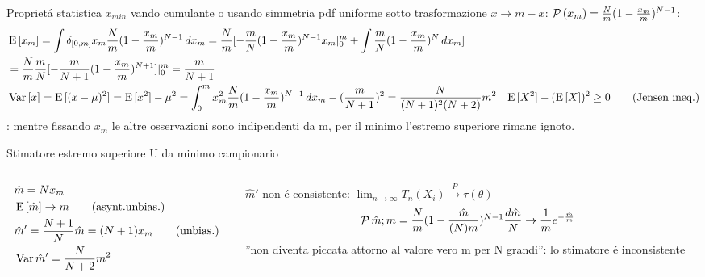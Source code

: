 \documentclass[asd-beamer.tex]{subfiles}
\begin{document}
\begin{frame}{Propriet\'a statistica $x_{min}$}
vando cumulante o usando simmetria pdf uniforme sotto trasformazione $x\to m-x$: $\operatorname{\mathcal{P}}{(x_m)}=\frac{N}{m}(1-\frac{x_m}{m})^{N-1}$:
\begin{align*}
&\operatorname{E}{[x_m]}=\int\delta_{[0,m]}x_m\frac{N}{m}(1-\frac{x_m}{m})^{N-1}\,dx_m=\frac{N}{m}[-\frac{m}{N}(1-\frac{x_m}{m})^{N-1}x_m|_0^m+\int\frac{m}{N}(1-\frac{x_m}{m})^N\,dx_m]\\
&=\frac{N}{m}\frac{m}{N}[-\frac{m}{N+1}(1-\frac{x_m}{m})^{N+1}]|_0^m=\frac{m}{N+1}\\
&\operatorname{Var}{[x]}=\operatorname{E}{[(x-\mu)^2]}=\operatorname{E}{[x^2]}-\mu^2=\int_0^mx_m^2\frac{N}{m}(1-\frac{x_m}{m})^{N-1}\,dx_m-(\frac{m}{N+1})^2=\frac{N}{(N+1)^2(N+2)}m^2
&\operatorname{E}{[X^2]}-(\operatorname{E}{[X]})^2\geq0\tag{Jensen ineq.}
\end{align*}
: mentre fissando $x_m$ le altre osservazioni sono indipendenti da m, per il minimo l'estremo superiore rimane ignoto.
\end{frame}

\begin{frame}{Stimatore estremo superiore U da minimo campionario}
\begin{columns}[T]
\begin{column}{0.5\textwidth}
\begin{align*}
&\hat{m}=Nx_m\\
&\operatorname{E}{[\hat{m}]}\to m\tag{asynt.unbias.}\\
&\hat{m}'=\frac{N+1}{N}\hat{m}=(N+1)x_m\tag{unbias.}\\
&\operatorname{Var}{\hat{m}'}=\frac{N}{N+2}m^2
\end{align*}
\end{column}
\begin{column}{0.5\textwidth}
$\hat{m}'$ non \'e consistente: $\lim_{n\to\infty}T_n(X_i)\xrightarrow{P}\tau(\theta)$
\begin{align*}
&\operatorname{\mathcal{P}}{\hat{m};m}=\frac{N}{m}(1-\frac{\hat{m}}{(N)m})^{N-1}\frac{d\hat{m}}{N}\to\frac{1}{m}e^{-\frac{\hat{m}}{m}}
\end{align*}
''non diventa piccata attorno al valore vero m per N grandi'': lo stimatore \'e inconsistente
\end{column}
\end{columns}
\end{frame}
\end{document}
